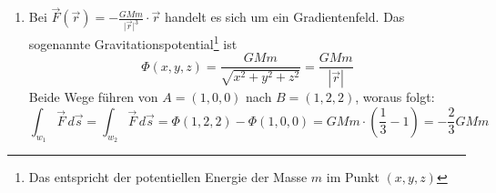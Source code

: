 \begin{enumerate}
          Weil der Einheitskreis ein geschlossener Weg ist (Anfangspunkt = Endpunkt), gilt: \[\oint_K \vec{F}_2 d\vec{s} = 0\]
    \item Bei \(\vec{F}(\vec{r})=-\frac{GMm}{\lvert \vec{r}\rvert^3} \cdot \vec{r} \) handelt es sich um ein Gradientenfeld. Das sogenannte Gravitationspotential\footnote{Das entspricht der potentiellen Energie der Masse \(m\) im Punkt \((x,y,z)\)} ist
          \[ \Phi(x, y, z) = \frac{GMm}{\sqrt{x^2 + y^2 + z^2}} = \frac{GMm}{|\vec{r}|}\]
          Beide Wege führen von \(A=(1,0,0)\) nach \(B=(1,2,2)\), woraus folgt:
          \[\int_{w_1} \vec{F} \, d\vec{s} = \int_{w_2} \vec{F} \, d\vec{s} = \Phi(1,2,2)-\Phi(1,0,0) = GMm\cdot \left( \frac{1}{3} - 1\right) =-\frac{2}{3} GMm\]
\end{enumerate}
